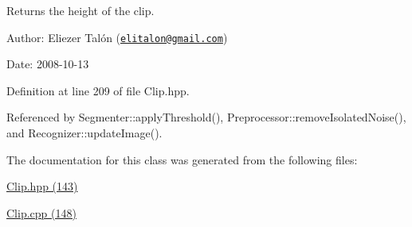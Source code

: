 Returns the height of the clip. 

\begin{Desc}
\item[Author:]Eliezer Talón (\href{mailto:elitalon@gmail.com}{\tt elitalon@gmail.com}) \end{Desc}
\begin{Desc}
\item[Date:]2008-10-13 \end{Desc}


Definition at line 209 of file Clip.hpp.

Referenced by Segmenter::applyThreshold(), Preprocessor::removeIsolatedNoise(), and Recognizer::updateImage().

The documentation for this class was generated from the following files:\begin{CompactItemize}
\item 
\hyperlink{_clip_8hpp}{Clip.hpp (143)}\item 
\hyperlink{_clip_8cpp}{Clip.cpp (148)}\end{CompactItemize}
